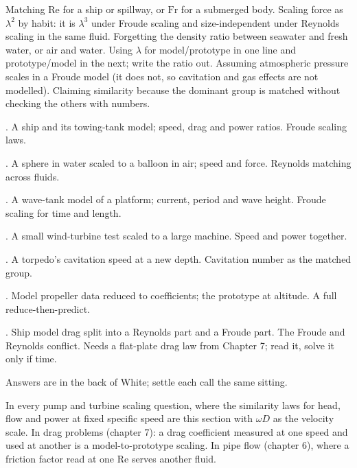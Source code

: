 \begin{trap}
Matching $\mathrm{Re}$ for a ship or spillway, or $\mathrm{Fr}$ for a submerged body. Scaling force as $\lambda^2$ by habit: it is $\lambda^3$ under Froude scaling and size-independent under Reynolds scaling in the same fluid. Forgetting the density ratio between seawater and fresh water, or air and water. Using $\lambda$ for model/prototype in one line and prototype/model in the next; write the ratio out. Assuming atmospheric pressure scales in a Froude model (it does not, so cavitation and gas effects are not modelled). Claiming similarity because the dominant group is matched without checking the others with numbers.
\end{trap}

\begin{ladder}
\item {}. A ship and its towing-tank model; speed, drag and power ratios. Froude scaling laws.
\item {}. A sphere in water scaled to a balloon in air; speed and force. Reynolds matching across fluids.
\item {}. A wave-tank model of a platform; current, period and wave height. Froude scaling for time and length.
\item {}. A small wind-turbine test scaled to a large machine. Speed and power together.
\item {}. A torpedo's cavitation speed at a new depth. Cavitation number as the matched group.
\item {}. Model propeller data reduced to coefficients; the prototype at altitude. A full reduce-then-predict.
\item {}. Ship model drag split into a Reynolds part and a Froude part. The Froude and Reynolds conflict. Needs a flat-plate drag law from Chapter 7; read it, solve it only if time.
\end{ladder}
Answers are in the back of White; settle each call the same sitting.


\begin{hides}
In every pump and turbine scaling question, where the similarity laws for head, flow and power at fixed specific speed are this section with $\omega D$ as the velocity scale. In drag problems (chapter 7): a drag coefficient measured at one speed and used at another is a model-to-prototype scaling. In pipe flow (chapter 6), where a friction factor read at one $\mathrm{Re}$ serves another fluid.
\end{hides}
